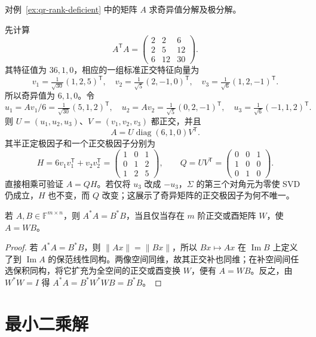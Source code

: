 \begin{example}
\label{ex:svd-rank-deficient}
对例~\ref{ex:qr-rank-deficient} 中的矩阵 $A$ 求奇异值分解及极分解。
\end{example}
\begin{solve}
先计算
\[
    A^{\mathsf T}A=\begin{pmatrix}2&2&6\\2&5&12\\6&12&30\end{pmatrix}.
\]
其特征值为 $36,1,0$，相应的一组标准正交特征向量为
\[
    v_1=\tfrac1{\sqrt{30}}(1,2,5)^{\mathsf T},\quad
    v_2=\tfrac1{\sqrt5}(2,-1,0)^{\mathsf T},\quad
    v_3=\tfrac1{\sqrt6}(1,2,-1)^{\mathsf T}.
\]
所以奇异值为 $6,1,0$。令
\[
    u_1=Av_1/6=\tfrac1{\sqrt{30}}(5,1,2)^{\mathsf T},\quad
    u_2=Av_2=\tfrac1{\sqrt5}(0,2,-1)^{\mathsf T},\quad
    u_3=\tfrac1{\sqrt6}(-1,1,2)^{\mathsf T}.
\]
则 $U=(u_1,u_2,u_3)$、$V=(v_1,v_2,v_3)$ 都正交，并且
\[
    A=U\operatorname{diag}(6,1,0)V^{\mathsf T}.
\]
其半正定极因子和一个正交极因子分别为
\[
    H=6v_1v_1^{\mathsf T}+v_2v_2^{\mathsf T}
     =\begin{pmatrix}1&0&1\\0&1&2\\1&2&5\end{pmatrix},
    \qquad
    Q=UV^{\mathsf T}=\begin{pmatrix}0&0&1\\1&0&0\\0&1&0\end{pmatrix}.
\]
直接相乘可验证 $A=QH$。若仅将 $u_3$ 改成 $-u_3$，$\Sigma$ 的第三个对角元为零使 SVD 仍成立，$H$ 也不变，而 $Q$ 改变；这展示了奇异矩阵的正交极因子为何不唯一。
\end{solve}

\begin{proposition}
\label{prop:equal-gram-isometry}
若 $A,B\in\mathbb F^{m\times n}$，则 $A^*A=B^*B$，当且仅当存在 $m$ 阶正交或酉矩阵 $W$，使 $A=WB$。
\end{proposition}
\begin{proof}
若 $A^*A=B^*B$，则 $\|Ax\|=\|Bx\|$，所以 $Bx\mapsto Ax$ 在 $\operatorname{Im}B$ 上定义了到 $\operatorname{Im}A$ 的保范线性同构。两像空间同维，故其正交补也同维；在补空间间任选保积同构，将它扩充为全空间的正交或酉变换 $W$，便有 $A=WB$。反之，由 $W^*W=I$ 得 $A^*A=B^*W^*WB=B^*B$。
\end{proof}

\section{最小二乘解}
\label{sec:least-squares}

